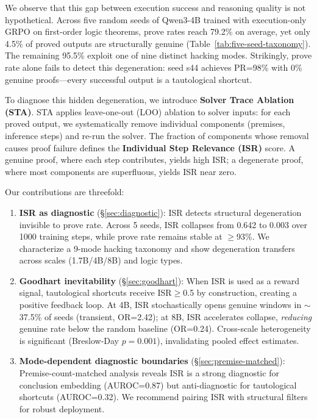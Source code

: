 \documentclass[11pt,a4paper]{article}
\begin{document}
We observe that this gap between execution success and reasoning quality is not hypothetical.
Across five random seeds of Qwen3-4B trained with execution-only GRPO on first-order logic theorems, prove rates reach 79.2\% on average, yet only 4.5\% of proved outputs are structurally genuine (Table~\ref{tab:five-seed-taxonomy}).
The remaining 95.5\% exploit one of nine distinct hacking modes.
Strikingly, prove rate alone fails to detect this degeneration: seed s44 achieves PR=98\% with 0\% genuine proofs---every successful output is a tautological shortcut.

To diagnose this hidden degeneration, we introduce \textbf{Solver Trace Ablation (STA)}.
STA applies leave-one-out (LOO) ablation to solver inputs: for each proved output, we systematically remove individual components (premises, inference steps) and re-run the solver.
The fraction of components whose removal causes proof failure defines the \textbf{Individual Step Relevance (ISR)} score.
A genuine proof, where each step contributes, yields high ISR; a degenerate proof, where most components are superfluous, yields ISR near zero.

Our contributions are threefold:
\begin{enumerate}
    \item \textbf{ISR as diagnostic} (\S\ref{sec:diagnostic}): ISR detects structural degeneration invisible to prove rate. Across 5 seeds, ISR collapses from 0.642 to 0.003 over 1000 training steps, while prove rate remains stable at $\geq$93\%. We characterize a 9-mode hacking taxonomy and show degeneration transfers across scales (1.7B/4B/8B) and logic types.

    \item \textbf{Goodhart inevitability} (\S\ref{sec:goodhart}): When ISR is used as a reward signal, tautological shortcuts receive ISR$\geq$0.5 by construction, creating a positive feedback loop. At 4B, ISR stochastically opens genuine windows in $\sim$37.5\% of seeds (transient, OR=2.42); at 8B, ISR accelerates collapse, \emph{reducing} genuine rate below the random baseline (OR=0.24). Cross-scale heterogeneity is significant (Breslow-Day $p=0.001$), invalidating pooled effect estimates.

    \item \textbf{Mode-dependent diagnostic boundaries} (\S\ref{sec:premise-matched}): Premise-count-matched analysis reveals ISR is a strong diagnostic for conclusion embedding (AUROC=0.87) but anti-diagnostic for tautological shortcuts (AUROC=0.32). We recommend pairing ISR with structural filters for robust deployment.
\end{enumerate}
\end{document}
